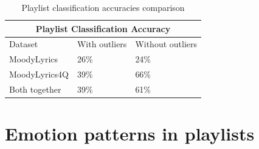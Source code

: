 \begin{table}[H]
\centering
\begin{tabular}{ |p{3cm}||p{1.5cm}|p{1.5cm}| }
 \hline
 \multicolumn{3}{|c|}{Playlist Classification Accuracy} \\
 \hline
Dataset & With outliers & Without outliers\\
 \hline
MoodyLyrics & 26\% & 24\%\\
MoodyLyrics4Q  & 39\%    &66\%\\
Both together &   39\%  & 61\%\\
\hline
\end{tabular}
\caption{Playlist classification accuracies comparison} \label{tab:comparison2}
\end{table}

\section{Emotion patterns in playlists}







 
